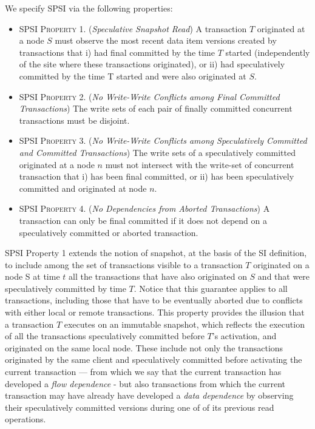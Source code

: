 We specify SPSI via the following properties:
\begin{itemize}
\item \textsc{SPSI Property 1.} (\textit{Speculative Snapshot Read}) A transaction $T$ originated at a node $S$ must observe the most recent data item versions created by  transactions that i) had final committed by the time $T$ started (independently of the site where these transactions originated), or ii) had speculatively committed by the time T started and were also originated at  $S$.
\item \textsc{SPSI Property 2.} (\textit{No Write-Write Conflicts among Final Committed Transactions}) The write sets of
each pair of finally committed concurrent transactions must be disjoint.
\item \textsc{SPSI Property 3.} (\textit{No Write-Write Conflicts among Speculatively Committed and Committed Transactions}) The write sets of a speculatively committed originated at a node $n$ must not intersect with the write-set of concurrent transaction that i) has been final committed, or ii) has been speculatively committed and originated at node $n$.
\item \textsc{SPSI Property 4.} (\textit{No Dependencies from Aborted Transactions}) A transaction can only be final committed if it does not depend on a speculatively committed or aborted transaction.
\end{itemize}

SPSI Property 1 extends the notion of snapshot, at the basis of the SI definition, to include among the set of  transactions visible to a transaction $T$ originated on a node S at time $t$ all the transactions that have also originated on $S$ and that were speculatively committed by time $T$. Notice that this guarantee applies to all transactions, including those that have to be eventually aborted due to conflicts with either local or remote transactions. This property provides the illusion that a transaction $T$ executes on an immutable snapshot, which reflects the execution of all the transactions speculatively committed before $T$'s activation, and originated on the same local node. These include not only the transactions originated by the same client and speculatively committed before activating the current transaction --- from which we say that the current transaction has developed a \textit{flow dependence} - but also transactions from which the current transaction may have already have developed a \textit{data dependence} by observing their speculatively committed versions during one of of its previous read operations. 

